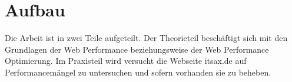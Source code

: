 \section{Aufbau}
Die Arbeit ist in zwei Teile aufgeteilt. Der Theorieteil beschäftigt sich mit den Grundlagen der Web Performance beziehungsweise der Web Performance Optimierung. Im Praxisteil wird versucht die Webseite itsax.de auf Performancemängel zu untersuchen und sofern vorhanden sie zu beheben. 
